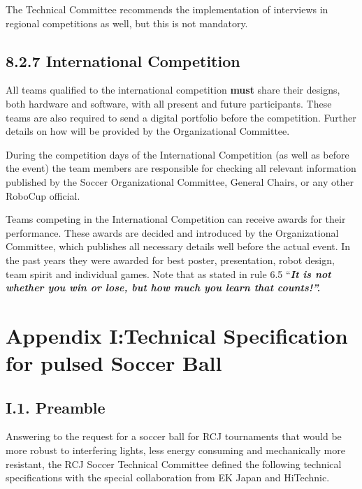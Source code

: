 \documentclass{article}
\begin{document}
\textcolor{color-5}{The Technical Committee recommends the implementation of interviews in regional competitions as well, but this is not mandatory.} 

\subsection{\textcolor{color-5}{8.2.7 International Competition} \label{ref-061}}

\textcolor{color-5}{All teams qualified to the international competition} \textbf{\textcolor{color-5}{must}} \textcolor{color-5}{share their designs, both hardware and software, with all present and future participants. These teams are also required to send a digital portfolio before the competition. Further details on how will be provided by the Organizational Committee.}

\textcolor{color-5}{During the competition days of the International Competition (as well as before the event) the team members are responsible for checking all relevant information published by the Soccer Organizational Committee, General Chairs, or any other RoboCup official.}

\textcolor{color-5}{Teams competing in the International Competition can receive awards for their performance. These awards are decided and introduced by the Organizational Committee, which publishes all necessary details well before the actual event. In the past years they were awarded for best poster, presentation, robot design, team spirit and individual games. Note that as stated in rule 6.5 ``}\textbf{\textit{\textcolor{color-5}{It is not whether you win or lose, but how much you learn that counts!''.}}} 

\section{Appendix I:Technical Specification for pulsed Soccer Ball\label{ref-062}}

\subsection{I.1. Preamble} 

Answering to the request for a soccer ball for RCJ tournaments that would be more robust to interfering lights, less energy consuming and mechanically more resistant, the RCJ Soccer Technical Committee defined the following technical specifications with the special collaboration from EK Japan and HiTechnic. 
\end{document}
